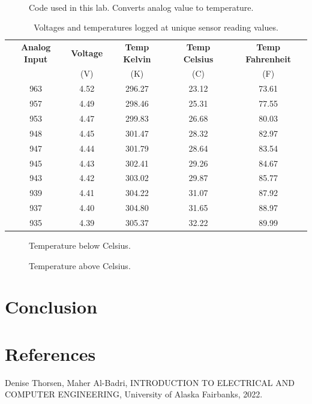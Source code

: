 \documentclass{article}
\begin{document}
\paragraph{}

\paragraph{}

\begin{figure}[H]
	\caption{Code used in this lab. Converts analog value to temperature.}
\end{figure}


\begin{table}[H]
\begin{tabular}{ | c | c | c | c | c | }
	\hline
	\textbf{Analog Input} &
	\textbf{Voltage} &
	\textbf{Temp Kelvin} &
	\textbf{Temp Celsius} &
	\textbf{Temp Fahrenheit} \\
	& (V) & (K) & (C) & (F) \\
	\hline
	963 & 4.52 & 296.27 & 23.12 & 73.61 \\
	\hline
	957 & 4.49 & 298.46 & 25.31 & 77.55 \\
	\hline
	953 & 4.47 & 299.83 & 26.68 & 80.03 \\
	\hline
	948 & 4.45 & 301.47 & 28.32 & 82.97 \\
	\hline
	947 & 4.44 & 301.79 & 28.64 & 83.54 \\
	\hline
	945 & 4.43 & 302.41 & 29.26 & 84.67 \\
	\hline
	943 & 4.42 & 303.02 & 29.87 & 85.77 \\
	\hline
	939 & 4.41 & 304.22 & 31.07 & 87.92 \\
	\hline
	937 & 4.40 & 304.80 & 31.65 & 88.97 \\
	\hline
	935 & 4.39 & 305.37 & 32.22 & 89.99 \\
	\hline
\end{tabular}
\caption{\label{tab:table-name} Voltages and temperatures logged at unique sensor reading values.}
\end{table}

\begin{figure}[H]
	\caption{Temperature below Celsius.}
\end{figure}

\begin{figure}[H]
	\caption{Temperature above Celsius.}
\end{figure}

\newpage
\section{Conclusion}

\newpage
\section{References}
\noindent
[1] Denise Thorsen, Maher Al-Badri, INTRODUCTION TO ELECTRICAL AND COMPUTER ENGINEERING, University of Alaska Fairbanks, 2022.
\newline
\newline
\noindent
\end{document}
